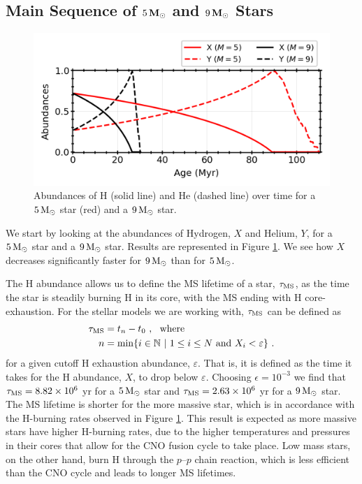\subsection{Main Sequence of $5 \, {\rm \textbf{M}}_\odot$ and $9 \,{\rm \textbf{M}}_\odot$ Stars}
\begin{figure}[!ht]
    \centering
    \includegraphics[width=1.0\columnwidth]{../figures/abundances.png}  %
    \caption{\small Abundances of H (solid line) and He (dashed line) over time for a $5 \, {\rm M}_\odot$ star (red) and a $9\, {\rm M}_\odot$ star.}
    \label{fig:abundances}
\end{figure}
We start by looking at the abundances of Hydrogen, $X$ and Helium, $Y$, for a $5 \, {\rm M}_\odot$ star and a $9 \, {\rm M}_\odot$ star. Results are represented in Figure \ref{fig:abundances}. We see how $X$ decreases significantly faster for $ 9 \,{\rm M}_\odot$ than for $5 \,{\rm M}_\odot$.

The H abundance allows us to define the MS lifetime of a star, $\tau_{\rm MS}$, as the time the star is steadily burning H in its core, with the MS ending with H core-exhaustion. For the stellar models we are working with, $\tau_{\rm MS}$ can be defined as
\begin{align}
    \tau_{\rm MS} & = t_n - t_0 \ , \ \ {\rm where}                                                              \notag              \\
    n             & = {\rm min}\{i\in \mathbb{N} \ | \  1 \leq i \leq N \ {\rm and} \ X_i < \varepsilon\} \ . \label{eq:MS_lifetime}
\end{align}
for a given cutoff H exhaustion abundance, $\varepsilon$. That is, it is defined as the time it takes for the H abundance,
$X$, to drop below $\varepsilon$. Choosing $\epsilon = 10^{-3}$ we find that $\tau_{\rm MS} = 8.82 \times 10^6$ yr for a $5 \, {\rm M}_\odot$ star and $\tau_{\rm MS} = 2.63 \times 10^6$ yr for a $9 \, {\rm M}_\odot$ star. The MS lifetime is shorter for the more massive star, which is in accordance with the H-burning rates observed in Figure \ref{fig:abundances}. This result is expected as more massive stars have higher H-burning rates, due to the higher temperatures and pressures in their cores that allow for the CNO fusion cycle to take place. Low mass stars, on the other hand, burn H through the $p\text{--}p$ chain reaction, which is less efficient than the CNO cycle and leads to longer MS lifetimes.


